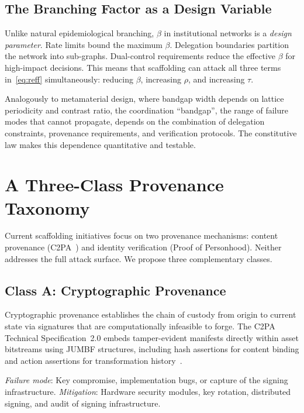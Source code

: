 \documentclass[runningheads]{llncs}
\begin{document}
\subsection{The Branching Factor as a Design Variable}

Unlike natural epidemiological branching, $\beta$ in institutional networks is a \emph{design parameter}. Rate limits bound the maximum $\beta$. Delegation boundaries partition the network into sub-graphs. Dual-control requirements reduce the effective $\beta$ for high-impact decisions. This means that scaffolding can attack all three terms in~\eqref{eq:reff} simultaneously: reducing $\beta$, increasing $\rho$, and increasing $\tau$.

Analogously to metamaterial design, where bandgap width depends on lattice periodicity and contrast ratio, the coordination ``bandgap'', the range of failure modes that cannot propagate, depends on the combination of delegation constraints, provenance requirements, and verification protocols. The constitutive law makes this dependence quantitative and testable.


\section{A Three-Class Provenance Taxonomy}
\label{sec:provenance}

Current scaffolding initiatives focus on two provenance mechanisms: content provenance (C2PA~\cite{c2pa2024}) and identity verification (Proof of Personhood). Neither addresses the full attack surface. We propose three complementary classes.

\subsection{Class A: Cryptographic Provenance}

Cryptographic provenance establishes the chain of custody from origin to current state via signatures that are computationally infeasible to forge. The C2PA Technical Specification~2.0 embeds tamper-evident manifests directly within asset bitstreams using JUMBF structures, including hash assertions for content binding and action assertions for transformation history~\cite{c2pa2024}.

\emph{Failure mode}: Key compromise, implementation bugs, or capture of the signing infrastructure. \emph{Mitigation}: Hardware security modules, key rotation, distributed signing, and audit of signing infrastructure.
\end{document}
